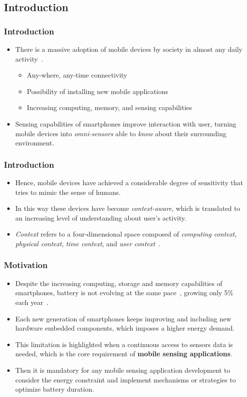 \documentclass[compress,9pt,xcolor={dvipsnames,table}]{beamer}
\begin{document}
\subsection{Introduction}
\begin{frame}\frametitle{Introduction}
\begin{itemize}
	\item There is a massive adoption of mobile devices by society in almost any daily activity~\cite{Islam2014}.
	\begin{itemize}
		\item Any-where, any-time connectivity
		\item Possibility of installing new mobile applications
		\item Increasing computing, memory, and sensing capabilities
	\end{itemize}
	\item Sensing capabilities of smartphones improve interaction with user, turning mobile devices into \emph{omni-sensors} able to \emph{know} about their surrounding environment.
\end{itemize}
\end{frame}

\begin{frame}\frametitle{Introduction}
\begin{itemize}
	\item Hence, mobile devices have achieved a considerable degree of sensitivity that tries to mimic the sense of humans.
	\item In this way these devices have become \emph{context-aware}, which is translated to an increasing level of understanding about user's activity.
  \item \emph{Context} refers to a four-dimensional space composed of \emph{computing context}, \emph{physical context}, \emph{time context}, and \emph{user context}~\cite{Chen2000}.
\end{itemize}
\end{frame}


\begin{frame}\frametitle{Motivation}
\begin{itemize}
	\item Despite the increasing computing, storage and memory capabilities of smartphones, battery is not evolving at the same pace~\cite{Kjaergaard2012}, growing only 5\% each year~\cite{Ma2012}.
	\item Each new generation of smartphones keeps improving and including new hardware embedded components, which imposes a higher energy demand.
	\item This limitation is highlighted when a continuous access to sensors data is needed, which is the core requirement of \textbf{mobile sensing applications}.
  \item Then it is mandatory for any mobile sensing application development to consider the energy constraint and implement mechanisms or strategies to optimize battery duration.
\end{itemize}
\end{frame}
\end{document}

